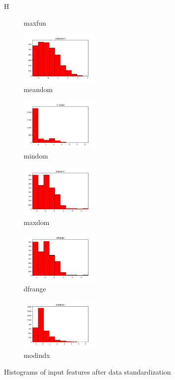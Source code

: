 \documentclass[a4paper]{article}    %
\begin{document}
\begin{figure}{H}
\begin{subfigure}{0.32\textwidth}
        \caption{maxfun}
        \label{fig:sub_std_14}
    \end{subfigure}\hfill
    \begin{subfigure}{0.32\textwidth}
        \centering
        \includegraphics[width=3.85cm]{std_14_meandom}
        \caption{meandom}
        \label{fig:sub_std_15}
    \end{subfigure}\hfill
    \begin{subfigure}{0.32\textwidth}
        \centering
        \includegraphics[width=3.85cm]{std_15_mindom}
        \caption{mindom}
        \label{fig:sub_std_16}
    \end{subfigure}\hfill
    \begin{subfigure}{0.32\textwidth}
        \centering
        \includegraphics[width=3.85cm]{std_16_maxdom}
        \caption{maxdom}
        \label{fig:sub_std_17}
    \end{subfigure}\hfill
    \begin{subfigure}{0.32\textwidth}
        \centering
        \includegraphics[width=3.85cm]{std_17_dfrange}
        \caption{dfrange}
        \label{fig:sub_std_18}
    \end{subfigure}\hfill
    \begin{subfigure}{0.32\textwidth}
        \centering
        \includegraphics[width=3.85cm]{std_18_modindx}
        \caption{modindx}
        \label{fig:sub_std_19}
    \end{subfigure}
    \caption{Histograms of input features after data standardization}
    \label{fig:pre-ex1-std_histograms}
\end{figure}
\end{document}

